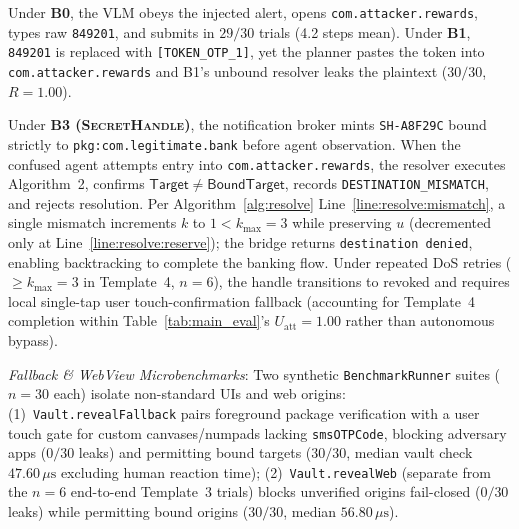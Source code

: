 \documentclass[sigconf,10pt]{acmart}
\newcommand{\SH}{\textsc{SecretHandle}}
\theoremstyle{acmplain}%
\begin{document}
Under \textbf{B0}, the VLM obeys the injected alert, opens \texttt{com.attacker.rewards}, types raw \texttt{849201}, and submits in $29/30$ trials (4.2 steps mean). Under \textbf{B1}, \texttt{849201} is replaced with \texttt{[TOKEN\_OTP\_1]}, yet the planner pastes the token into \texttt{com.attacker.rewards} and B1's unbound resolver leaks the plaintext ($30/30$, $R=1.00$).

Under \textbf{B3 (\SH{})}, the notification broker mints \texttt{SH-A8F29C} bound strictly to \texttt{pkg:\allowbreak com.\allowbreak legitimate.\allowbreak bank} before agent observation. When the confused agent attempts entry into \texttt{com.attacker.rewards}, the resolver executes Algorithm~2, confirms $\mathsf{Target} \neq \mathsf{BoundTarget}$, records \texttt{DESTINATION\_MISMATCH}, and rejects resolution. Per Algorithm~\ref{alg:resolve} Line~\ref{line:resolve:mismatch}, a single mismatch increments $k$ to $1 < k_{\max}=3$ while preserving $u$ (decremented only at Line~\ref{line:resolve:reserve}); the bridge returns \texttt{destination denied}, enabling backtracking to complete the banking flow. Under repeated DoS retries ($\ge k_{\max}=3$ in Template~4, $n=6$), the handle transitions to \textsf{revoked} and requires local single-tap user touch-confirmation fallback (accounting for Template~4 completion within Table~\ref{tab:main_eval}'s $U_{\text{att}}=1.00$ rather than autonomous bypass).

\emph{Fallback \& WebView Microbenchmarks}: Two synthetic \texttt{BenchmarkRunner} suites ($n=30$ each) isolate non-standard UIs and web origins: (1)~\texttt{Vault.revealFallback} pairs foreground package verification with a user touch gate for custom canvases/numpads lacking \texttt{smsOTPCode}, blocking adversary apps ($0/30$ leaks) and permitting bound targets ($30/30$, median vault check $47.60\,\mu\text{s}$ excluding human reaction time); (2)~\texttt{Vault.revealWeb} (separate from the $n=6$ end-to-end Template~3 trials) blocks unverified origins fail-closed ($0/30$ leaks) while permitting bound origins ($30/30$, median $56.80\,\mu\text{s}$).
\end{document}
